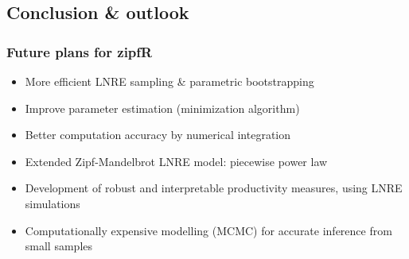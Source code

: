 \documentclass[handout,notes=show,t]{beamer} %
\begin{document}
\subsection{Conclusion \& outlook}

\begin{frame}
  \frametitle{Future plans for zipfR}

  \begin{itemize}
  \item More efficient LNRE sampling \& parametric bootstrapping
  \item Improve parameter estimation (minimization algorithm)
  \item Better computation accuracy by numerical integration
  \item Extended Zipf-Mandelbrot LNRE model: piecewise power law
  \item Development of robust and interpretable productivity measures, using LNRE simulations
  \item Computationally expensive modelling (MCMC) for accurate inference from small samples
  \end{itemize}
\end{frame}

\begin{frame}[c]
  \begin{center}
  \end{center}
\end{frame}



\end{document}
